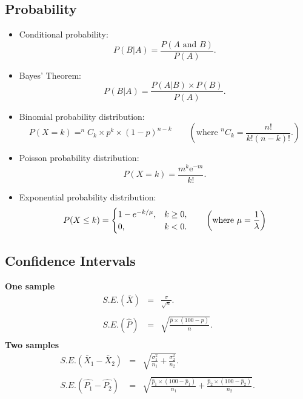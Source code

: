 \subsection*{Probability}
\begin{itemize}

\item Conditional probability:
\begin{equation*}
P(B|A)=\frac{P\left( A\text{ and }B\right) }{P\left( A\right) }.
\end{equation*}


\item Bayes' Theorem:
\begin{equation*}
P(B|A)=\frac{P\left(A|B\right) \times P(B) }{P\left( A\right) }.
\end{equation*}





\item Binomial probability distribution:
\begin{equation*}
P(X = k) = ^{n}C_{k} \times p^{k} \times \left( 1-p\right) ^{n-k}\qquad \left( \text{where  }
^{n}C_{k} =\frac{n!}{k!\left(n-k\right) !}. \right)
\end{equation*}

\item Poisson probability distribution:
\begin{equation*}
P(X = k) =\frac{m^{k}\mathrm{e}^{-m}}{k!}.
\end{equation*}

\item Exponential probability distribution:
\begin{equation*}
P(X \leq k) = \begin{cases}
1-e^{- k/\mu}, & k \ge 0, \\
0, & k < 0.
\end{cases}\qquad \left( \text{where  }
\mu = {1\over \lambda}\right)
\end{equation*}
\end{itemize}



\subsection*{Confidence Intervals}
{\bf One sample}
\begin{eqnarray*} S.E.(\bar{X})&=&\frac{\sigma}{\sqrt{n}}.\\\\
S.E.(\hat{P})&=&\sqrt{\frac{\hat{p}\times(100-\hat{p})}{n}}.\\
\end{eqnarray*}
{\bf Two samples}
\begin{eqnarray*}
S.E.(\bar{X}_1-\bar{X}_2)&=&\sqrt{\frac{\sigma^2_1}{n_1}+\frac{\sigma_2^2}{n_2}}.\\\\
S.E.(\hat{P_1}-\hat{P_2})&=&\sqrt{\frac{\hat{p}_1\times(100-\hat{p}_1)}{n_1}+\frac{\hat{p}_2\times(100-\hat{p}_2)}{n_2}}.\\\\
\end{eqnarray*}
